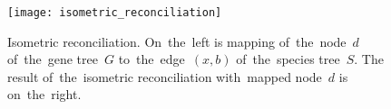 \begin{figure}[h]
	\centering
	\label{isometric_reconciliation}
  	\texttt{[image: isometric\_reconciliation]}
  	\caption{Isometric reconciliation. On~the~left is mapping of~the~node~$d$ of~the~gene tree~$G$ to~the~edge~$(x, b)$ of~the~species tree~$S$. The result of~the~isometric reconciliation with~mapped node~$d$ is on~the~right.}
\end{figure}










